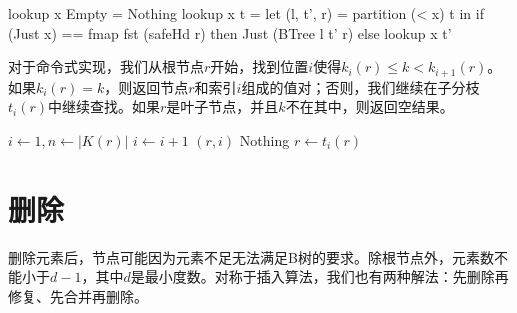 \documentclass[b5paper]{ctexart}
\begin{document}
\begin{Haskell}
lookup x Empty = Nothing
lookup x t = let (l, t', r) = partition (< x) t in
  if (Just x) == fmap fst (safeHd r) then Just (BTree l t' r)
  else lookup x t'
\end{Haskell}

对于命令式实现，我们从根节点$r$开始，找到位置$i$使得$k_i(r) \leq k < k_{i+1}(r)$。如果$k_i(r) = k$，则返回节点$r$和索引$i$组成的值对；否则，我们继续在子分枝$t_i(r)$中继续查找。如果$r$是叶子节点，并且$k$不在其中，则返回空结果。

\begin{algorithmic}[1]
  \Loop
    \State $i \gets 1, n \gets |K(r)|$
      \State $i \gets i + 1$
    \EndWhile
      \State \Return $(r, i)$
    \EndIf
      \State \Return Nothing 
    \Else
      \State $r \gets t_i(r)$ 
    \EndIf
  \EndLoop
\EndFunction
\end{algorithmic}

\begin{Exercise}\label{ex:btree-binary_lookup}
\end{Exercise}

\begin{Answer}[ref = {ex:btree-binary_lookup}]
\end{Answer}

\section{删除}

删除元素后，节点可能因为元素不足无法满足B树的要求。除根节点外，元素数不能小于$d - 1$，其中$d$是最小度数。对称于插入算法，我们也有两种解法：先删除再修复、先合并再删除。
\end{document}
